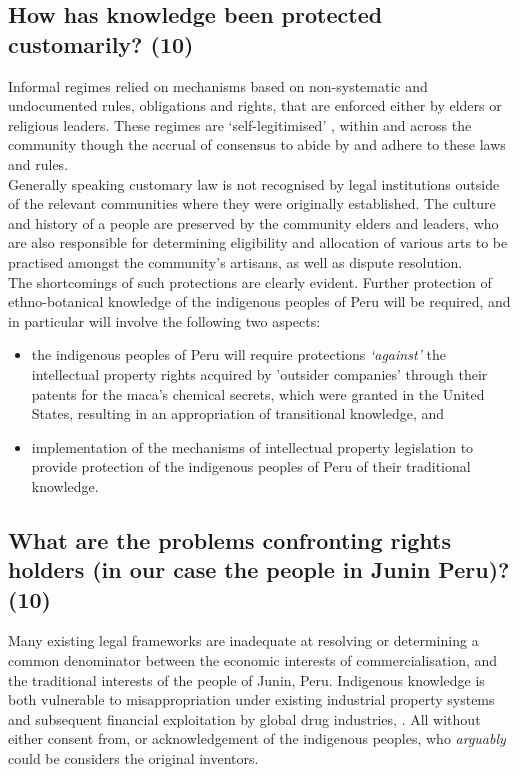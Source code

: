 \documentclass[11pt]{article}
\begin{document}
\subsection{How has knowledge been protected customarily? (10)}
\label{sec:org8459a81}

Informal regimes relied on mechanisms based on non-systematic and undocumented
rules, obligations and rights, that are enforced either by elders or religious
leaders. These regimes are `self-legitimised'
\cite{amechi15_leverag_trad_knowl_medicinal}, within and across the community
though the accrual of consensus to abide by and adhere to these laws and
rules.\\

Generally speaking customary law is not recognised by legal institutions outside
of the relevant communities where they were originally established. The culture
and history of a people are preserved by the community elders and leaders, who
are also responsible for determining eligibility and allocation of various arts
to be practised amongst the community's artisans, as well as dispute
resolution.\\

The shortcomings of such protections are clearly evident. Further protection of
ethno-botanical knowledge of the indigenous peoples of Peru will be required,
and in particular will involve the following two aspects:
\begin{itemize}
\item the indigenous peoples of Peru will require protections \emph{`against'} the
intellectual property rights acquired by 'outsider companies' through their
patents for the maca's chemical secrets, which were granted in the United
States, resulting in an appropriation of transitional knowledge, and
\item implementation of the mechanisms of intellectual property legislation to provide
protection of the indigenous peoples of Peru of their traditional knowledge.
\end{itemize}

\subsection{What are the problems confronting rights holders (in our case the people in Junin Peru)? (10)}
\label{sec:orge15fcf6}

Many existing legal frameworks are inadequate at resolving or determining a
common denominator between the economic interests of commercialisation, and the
traditional interests of the people of Junin, Peru. Indigenous knowledge is both
vulnerable to misappropriation under existing industrial property systems and
subsequent financial exploitation by global drug industries,
\cite{masango10_indigenous_trad_knowl_protect_prospects}. All without either
consent from, or acknowledgement of the indigenous peoples, who \emph{arguably} could
be considers the original inventors.\\
\end{document}
